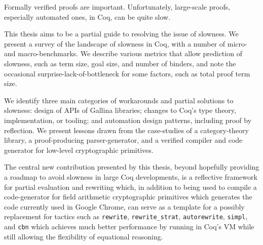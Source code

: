 %
%
%
Formally verified proofs are important.
Unfortunately, large-scale proofs, especially automated ones, in Coq, can be quite slow.

This thesis aims to be a partial guide to resolving the issue of slowness.
We present a survey of the landscape of slowness in Coq, with a number of micro- and macro-benchmarks.
We describe various metrics that allow prediction of slowness, such as term size, goal size, and number of binders, and note the occasional surprise-lack-of-bottleneck for some factors, such as total proof term size.

We identify three main categories of workarounds and partial solutions to slowness: design of APIs of Gallina libraries; changes to Coq's type theory, implementation, or tooling; and automation design patterns, including proof by reflection.
We present lessons drawn from the case-studies of a category-theory library, a proof-producing parser-generator, and a verified compiler and code generator for low-level cryptographic primitives.

The central new contribution presented by this thesis, beyond hopefully providing a roadmap to avoid slowness in large Coq developments, is a reflective framework for partial evaluation and rewriting which, in addition to being used to compile a code-generator for field arithmetic cryptographic primitives which generates the code currently used in Google Chrome, can serve as a template for a possibly replacement for tactics such as \texttt{rewrite}, \texttt{rewrite\_strat}, \texttt{autorewrite}, \texttt{simpl}, and \texttt{cbn} which achieves much better performance by running in Coq's VM while still allowing the flexibility of equational reasoning.
